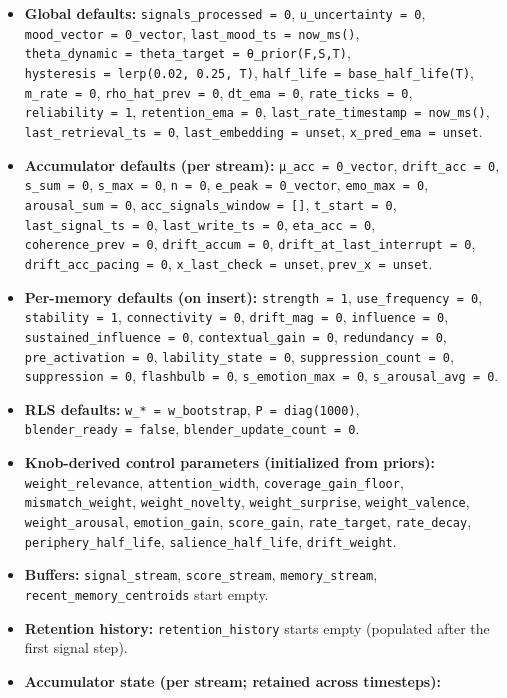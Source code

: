 \documentclass[
  letterpaper,
  DIV=11,
  numbers=noendperiod]{scrartcl}
\begin{document}
\begin{itemize}
\item
  \textbf{Global defaults:} \texttt{signals\_processed\ =\ 0},
  \texttt{u\_uncertainty\ =\ 0}, \texttt{mood\_vector\ =\ 0\_vector},
  \texttt{last\_mood\_ts\ =\ now\_ms()},
  \texttt{theta\_dynamic\ =\ theta\_target\ =\ θ\_prior(F,S,T)},
  \texttt{hysteresis\ =\ lerp(0.02,\ 0.25,\ T)},
  \texttt{half\_life\ =\ base\_half\_life(T)}, \texttt{m\_rate\ =\ 0},
  \texttt{rho\_hat\_prev\ =\ 0}, \texttt{dt\_ema\ =\ 0},
  \texttt{rate\_ticks\ =\ 0}, \texttt{reliability\ =\ 1},
  \texttt{retention\_ema\ =\ 0},
  \texttt{last\_rate\_timestamp\ =\ now\_ms()},
  \texttt{last\_retrieval\_ts\ =\ 0},
  \texttt{last\_embedding\ =\ unset}, \texttt{x\_pred\_ema\ =\ unset}.
\item
  \textbf{Accumulator defaults (per stream):}
  \texttt{μ\_acc\ =\ 0\_vector}, \texttt{drift\_acc\ =\ 0},
  \texttt{s\_sum\ =\ 0}, \texttt{s\_max\ =\ 0}, \texttt{n\ =\ 0},
  \texttt{e\_peak\ =\ 0\_vector}, \texttt{emo\_max\ =\ 0},
  \texttt{arousal\_sum\ =\ 0}, \texttt{acc\_signals\_window\ =\ {[}{]}},
  \texttt{t\_start\ =\ 0}, \texttt{last\_signal\_ts\ =\ 0},
  \texttt{last\_write\_ts\ =\ 0}, \texttt{eta\_acc\ =\ 0},
  \texttt{coherence\_prev\ =\ 0}, \texttt{drift\_accum\ =\ 0},
  \texttt{drift\_at\_last\_interrupt\ =\ 0},
  \texttt{drift\_acc\_pacing\ =\ 0}, \texttt{x\_last\_check\ =\ unset},
  \texttt{prev\_x\ =\ unset}.
\item
  \textbf{Per-memory defaults (on insert):} \texttt{strength\ =\ 1},
  \texttt{use\_frequency\ =\ 0}, \texttt{stability\ =\ 1},
  \texttt{connectivity\ =\ 0}, \texttt{drift\_mag\ =\ 0},
  \texttt{influence\ =\ 0}, \texttt{sustained\_influence\ =\ 0},
  \texttt{contextual\_gain\ =\ 0}, \texttt{redundancy\ =\ 0},
  \texttt{pre\_activation\ =\ 0}, \texttt{lability\_state\ =\ 0},
  \texttt{suppression\_count\ =\ 0}, \texttt{suppression\ =\ 0},
  \texttt{flashbulb\ =\ 0}, \texttt{s\_emotion\_max\ =\ 0},
  \texttt{s\_arousal\_avg\ =\ 0}.
\item
  \textbf{RLS defaults:} \texttt{w\_*\ =\ w\_bootstrap},
  \texttt{P\ =\ diag(1000)}, \texttt{blender\_ready\ =\ false},
  \texttt{blender\_update\_count\ =\ 0}.
\item
  \textbf{Knob-derived control parameters (initialized from priors):}
  \texttt{weight\_relevance}, \texttt{attention\_width},
  \texttt{coverage\_gain\_floor}, \texttt{mismatch\_weight},
  \texttt{weight\_novelty}, \texttt{weight\_surprise},
  \texttt{weight\_valence}, \texttt{weight\_arousal},
  \texttt{emotion\_gain}, \texttt{score\_gain}, \texttt{rate\_target},
  \texttt{rate\_decay}, \texttt{periphery\_half\_life},
  \texttt{salience\_half\_life}, \texttt{drift\_weight}.
\item
  \textbf{Buffers:} \texttt{signal\_stream}, \texttt{score\_stream},
  \texttt{memory\_stream}, \texttt{recent\_memory\_centroids} start
  empty.
\item
  \textbf{Retention history:} \texttt{retention\_history} starts empty
  (populated after the first signal step).
\item
  \textbf{Accumulator state (per stream; retained across timesteps):}


\end{itemize}
\end{document}
